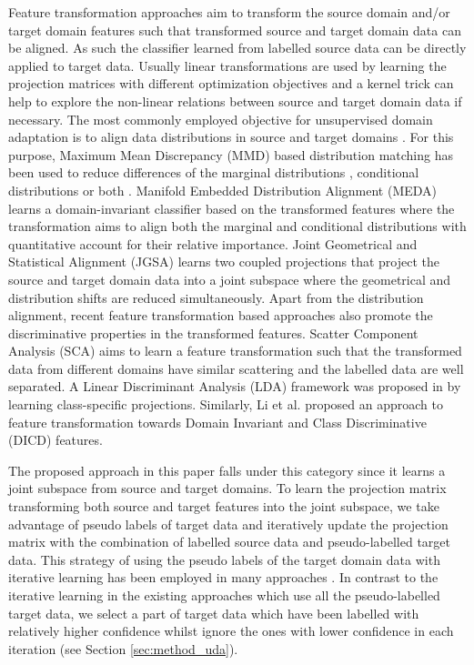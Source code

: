 \documentclass[conference]{IEEEtran}
\begin{document}
Feature transformation approaches aim to transform the source domain and/or target domain features such that transformed source and target domain data can be aligned. As such the classifier learned from labelled source data can be directly applied to target data. Usually linear transformations are used by learning the projection matrices with different optimization objectives and a kernel trick can help to explore the non-linear relations between source and target domain data if necessary. The most commonly employed objective for unsupervised domain adaptation is to align data distributions in source and target domains \cite{long2013transfer, long2014transfer}. For this purpose, Maximum Mean Discrepancy (MMD) based distribution matching has been used to reduce differences of the marginal distributions \cite{long2014transfer}, conditional distributions or both \cite{long2013transfer, wang2018visual}. 
Manifold Embedded Distribution Alignment (MEDA) \cite{wang2018visual} learns a domain-invariant classifier based on the transformed features where the transformation aims to align both the marginal and conditional distributions with quantitative account for their relative importance. 
Joint Geometrical and Statistical Alignment (JGSA) \cite{zhang2017joint} learns two coupled projections that project the source and target domain data into a joint subspace where the geometrical and distribution shifts are reduced simultaneously. 
Apart from the distribution alignment, recent feature transformation based approaches also promote the discriminative properties in the transformed features. Scatter Component Analysis (SCA) \cite{ghifary2017scatter} aims to learn a feature transformation such that the transformed data from different domains have similar scattering and the labelled data are well separated. A Linear Discriminant Analysis (LDA) framework was proposed in \cite{lu2018embarrassingly} by learning class-specific projections. Similarly, Li et al. \cite{li2018domain} proposed an approach to feature transformation towards Domain Invariant and Class Discriminative (DICD) features.

The proposed approach in this paper falls under this category since it learns a joint subspace from source and target domains. To learn the projection matrix transforming both source and target features into the joint subspace, we take advantage of pseudo labels of target data and iteratively update the projection matrix with the combination of labelled source data and pseudo-labelled target data. This strategy of using the pseudo labels of the target domain data with iterative learning has been employed in many approaches \cite{long2013transfer, long2014transfer, zhang2017joint, wang2018visual}. In contrast to the iterative learning in the existing approaches which use all the pseudo-labelled target data, we select a part of target data which have been labelled with relatively higher confidence whilst ignore the ones with lower confidence in each iteration (see Section \ref{sec:method_uda}).
\end{document}
